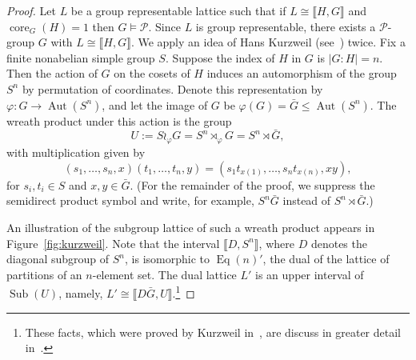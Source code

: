 \documentclass{gen-j-l}
\newcommand{\lb}{\ensuremath{\llbracket}}
\newcommand{\rb}{\ensuremath{\rrbracket}}
\newcommand{\<}{\ensuremath{\langle}}
\renewcommand{\>}{\ensuremath{\rangle}}
\theoremstyle{plain}
\theoremstyle{definition}
\theoremstyle{remark}
\numberwithin{theorem}{section}
\numberwithin{claim}{section}
\numberwithin{equation}{section}
\numberwithin{conjecture}{section}
\renewcommand{\leq}{\ensuremath{\leqslant}}
\newcommand{\Aut}{\ensuremath{\operatorname{Aut}}}
\newcommand{\Eq}{\ensuremath{\operatorname{Eq}}}
\newcommand{\Sub}{\ensuremath{\operatorname{Sub}}}
\newcommand{\core}{\ensuremath{\operatorname{core}}}
\newcommand{\2}{\ensuremath{\mathbf{2}}}
\newcommand{\3}{\ensuremath{\mathbf{3}}}
\newcommand{\cP}{\ensuremath{\mathcal{P}}}
\renewcommand{\phi}{\ensuremath{\varphi}}
\begin{document}
\begin{proof}
  Let $L$ be a group representable lattice such that if $L\cong \lb H,G \rb$ and
  $\core_G(H)=1$ then $G\vDash \cP$.
  Since $L$ is group representable, there exists a $\cP$-group $G$ with $L
  \cong \lb H,G \rb$. 
  We apply an idea of Hans Kurzweil (see~\cite{Kurzweil:1985}) twice.
Fix a finite nonabelian simple
  group $S$. Suppose the index of $H$ in $G$ is $|G:H| = n$.
  Then the action of $G$ on the cosets of $H$ induces an automorphism of the
  group $S^n$ by permutation of coordinates.  Denote this representation by
  $\phi: G \rightarrow \Aut(S^n)$, 
  and let the image of $G$ be $\phi(G) =
  \bar{G} \leq \Aut(S^n)$.  
  The wreath product under this action is the group
  \[
  U:= S\wr_\phi G = S^n \rtimes_\phi G = S^n \rtimes \bar{G}, %
  \]
  with multiplication given by
  \[
  (s_1, \dots, s_n, x) (t_1, \dots, t_n, y) = 
  (s_1 t_{x(1)}, \dots, s_nt_{x(n)}, x y),
  \]
  for $s_i, t_i \in S$ and $x, y \in \bar{G}$.  (For the remainder of the proof,
  we suppress the semidirect product symbol and write, for example, $S^n\bar{G}$
  instead of $S^n \rtimes \bar{G}$.)

  An illustration of the subgroup lattice of such a wreath product appears in
  Figure~\ref{fig:kurzweil}.  Note that the interval
  $\lb D, S^n \rb$, where $D$ denotes the diagonal subgroup of
  $S^n$, is isomorphic to $\Eq(n)'$, the dual of the lattice of partitions of an
  $n$-element set.
  The dual lattice $L'$ is an upper interval of $\Sub(U)$, namely,
  $L'\cong \lb D\bar{G}, U \rb$.\footnote{These facts, which were proved by Kurzweil
    in~\cite{Kurzweil:1985}, are discuss in greater detail in~\cite[Section 2.2]{DeMeo:thesis}.} 


\end{proof}
\end{document}
